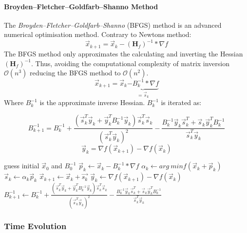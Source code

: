 \documentclass[Master]{subfiles}
\begin{document}
\paragraph{Broyden–Fletcher–Goldfarb–Shanno Method} \label{num:BFGS}
The \textit{Broyden–Fletcher–Goldfarb–Shanno} (BFGS) method \cite{broyden1970convergence}\cite{fletcher1970new}\cite{goldfrab1970family}\cite{schanno1970conditions} is an advanced numerical optimisation method.
Contrary to Newtons method:
$$
\vec{x}_{k+1} = \vec{x}_k - (\mathbf{H}_f)^{-1}*\nabla f
$$
The BFGS method only approximates the calculating and inverting the Hessian $(\mathbf{H}_f)^{-1}$. Thus, avoiding the  computational complexity of matrix inversion  $\mathcal{O}(n^3)$ reducing the BFGS method to  $\mathcal{O}(n^2)$.
$$
\vec{x}_{k+1} = \vec{x}_k \underbrace{- B_k^{-1} *\nabla f}_{= \vec{s}_k}
$$
Where $B_k^{-1}$ is the approximate inverse Hessian. $B_k^{-1}$ is iterated as:

$$
B_{k+1}^{-1} = B_k^{-1} + \frac{(\vec{s}_k^T \vec{y}_k + \vec{y}_k^T B_k^{-1}\vec{y}_k )\vec{s}_k^T\vec{s}_k}{( \vec{s}_k^T\vec{y}_k)^2} - \frac{ B_k^{-1} \vec{y}_k\vec{s}_k^T+ \vec{s}_k\vec{y}_k^T B_k^{-1} }{\vec{s}_k^T\vec{y}_k}
$$
$$
\vec{y}_{k} = \nabla f(\vec{x}_{k+1}) - \nabla f(\vec{x}_k)
$$


\begin{algorithm}
\caption{BGFS}\label{BGFSAlg}
\begin{algorithmic}[1]
\State guess initial $\vec{x}_0$ and $B_0^{-1}$ 
\Procedure{}{}
\State $\vec{p}_k \gets \vec{x}_k - B_k^{-1} *\nabla f$ 
\State $\alpha_k \gets arg \  min f(\vec{x}_k + \vec{p}_k) $ 
\State $\vec{s}_k \gets \alpha_k \vec{p}_k$
\State $\vec{x}_{k+1} \gets \vec{x}_k +\vec{s_k}$ 
\State $\vec{y}_{k} \gets \nabla f(\vec{x}_{k+1}) - \nabla f(\vec{x}_k)$
\State $B_{k+1}^{-1} \gets B_k^{-1} + \frac{(\vec{s}_k^T \vec{y}_k + \vec{y}_k^T B_k^{-1}\vec{y}_k )\vec{s}_k^T\vec{s}_k}{( \vec{s}_k^T\vec{y}_k)^2} - \frac{ B_k^{-1} \vec{y}_k\vec{s}_k^T+ \vec{s}_k\vec{y}_k^T B_k^{-1} }{\vec{s}_k^T\vec{y}_k}$ 
\EndWhile
\EndProcedure
\end{algorithmic}
\end{algorithm}

\subsubsection{Time Evolution}
\end{document}
